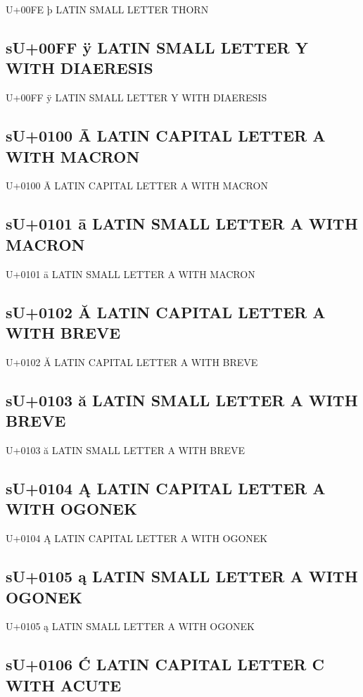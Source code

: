 U+00FE þ  LATIN SMALL LETTER THORN

\subsection{sU+00FF ÿ  LATIN SMALL LETTER Y WITH DIAERESIS}

U+00FF ÿ  LATIN SMALL LETTER Y WITH DIAERESIS

\subsection{sU+0100 Ā  LATIN CAPITAL LETTER A WITH MACRON}

U+0100 Ā  LATIN CAPITAL LETTER A WITH MACRON

\subsection{sU+0101 ā  LATIN SMALL LETTER A WITH MACRON}

U+0101 ā  LATIN SMALL LETTER A WITH MACRON

\subsection{sU+0102 Ă  LATIN CAPITAL LETTER A WITH BREVE}

U+0102 Ă  LATIN CAPITAL LETTER A WITH BREVE

\subsection{sU+0103 ă  LATIN SMALL LETTER A WITH BREVE}

U+0103 ă  LATIN SMALL LETTER A WITH BREVE

\subsection{sU+0104 Ą  LATIN CAPITAL LETTER A WITH OGONEK}

U+0104 Ą  LATIN CAPITAL LETTER A WITH OGONEK

\subsection{sU+0105 ą  LATIN SMALL LETTER A WITH OGONEK}

U+0105 ą  LATIN SMALL LETTER A WITH OGONEK

\subsection{sU+0106 Ć  LATIN CAPITAL LETTER C WITH ACUTE}

